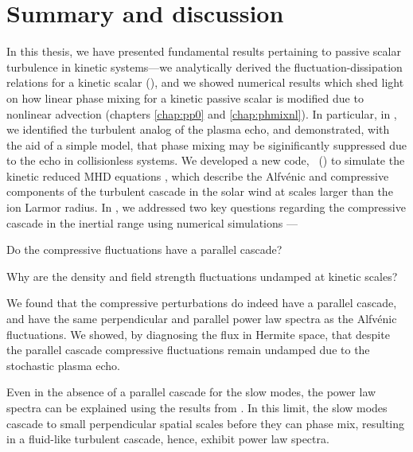 
\chapter{Summary and discussion}

In this thesis, we have presented fundamental results pertaining to passive scalar
turbulence in kinetic systems---we analytically derived the fluctuation-dissipation
relations for a kinetic scalar (), and we showed numerical results
which shed light on how linear phase mixing for a kinetic passive scalar is modified due
to nonlinear advection (chapters \ref{chap:pp0} and \ref{chap:phmixnl}). In particular, in
, we identified the turbulent analog of the plasma echo, and
demonstrated,
with the aid of a simple model, that phase mixing may be siginificantly suppressed due to the
echo in collisionless systems. We developed a new code, \Gand\ () to simulate the kinetic
reduced MHD equations \cite{tome}, which describe the Alfv\'{e}nic and compressive
components of the turbulent cascade in the solar wind at scales larger than the ion Larmor
radius. In , we addressed two key questions regarding the
compressive cascade in the inertial range using numerical simulations ---
\begin{inparaenum}
\item Do the compressive fluctuations have a parallel cascade?
\item Why are the density and field strength fluctuations undamped at kinetic scales?
\end{inparaenum}
We found that the compressive perturbations do indeed have a parallel cascade, and have
the same perpendicular and parallel power law spectra as the Alfv\'{e}nic 
fluctuations. We showed, by diagnosing the
flux in Hermite space, that despite the parallel cascade compressive fluctuations remain
undamped due to the stochastic plasma echo. 

Even in the absence of a parallel cascade for the slow modes, the power law spectra can be
explained using the results from . In this limit, the slow modes cascade
to small perpendicular spatial scales before they can phase mix, resulting in a fluid-like
turbulent cascade, hence, exhibit power law spectra. 

